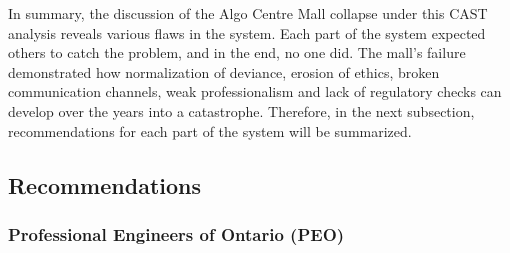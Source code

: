 \documentclass[12pt]{article}
\begin{document}
In summary, the discussion of the Algo Centre Mall collapse under this CAST analysis reveals various flaws in the system. Each part of the system expected others to catch the problem, and in the end, no one did. The mall’s failure demonstrated how normalization of deviance, erosion of ethics, broken communication channels, weak professionalism and lack of regulatory checks can develop over the years into a catastrophe. Therefore, in the next subsection, recommendations for each part of the system will be summarized.


\subsection{Recommendations}

\subsubsection{Professional Engineers of Ontario (PEO)}
\end{document}
